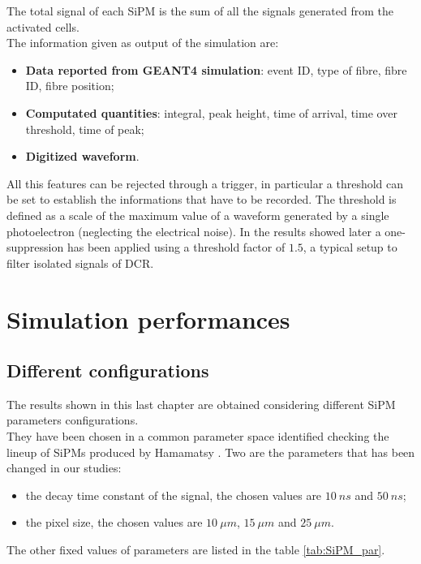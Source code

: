 The total signal of each SiPM is the sum of all the signals generated from the activated cells.\\

The information given as output of the simulation are:
\begin{itemize}
	\item \textbf{Data reported from GEANT4 simulation}: event ID, type of fibre, fibre ID, fibre position;
	\item \textbf{Computated quantities}: integral, peak height, time of arrival, time over threshold, time of peak;
	\item \textbf{Digitized waveform}.
\end{itemize}

All this features can be rejected through a trigger, in particular a threshold can be set to establish the informations that have to be recorded.
The threshold is defined as a scale of the maximum value of a waveform generated by a single photoelectron (neglecting the electrical noise). In the results showed later a one-suppression has been applied using a threshold factor of $1.5$, a typical setup to filter isolated signals of DCR.\\

\section{Simulation performances} \label{sec:Sim_perf}

\subsection{Different configurations} \label{subsec:SiPM_conf}
The results shown in this last chapter are obtained considering different SiPM parameters configurations.\\
They have been chosen in a common parameter space identified checking the lineup of SiPMs produced by Hamamatsy \cite{SiPM_lineup}. 
Two are the parameters that has been changed in our studies: 
\begin{itemize}
	\item the decay time constant of the signal, the chosen values are $10\ ns$ and $50\ ns$;
	\item the pixel size, the chosen values are $10\ \mu m$, $15\ \mu m$ and $25\ \mu m$.
\end{itemize}

The other fixed values of parameters are listed in the table \ref{tab:SiPM_par}.\\

